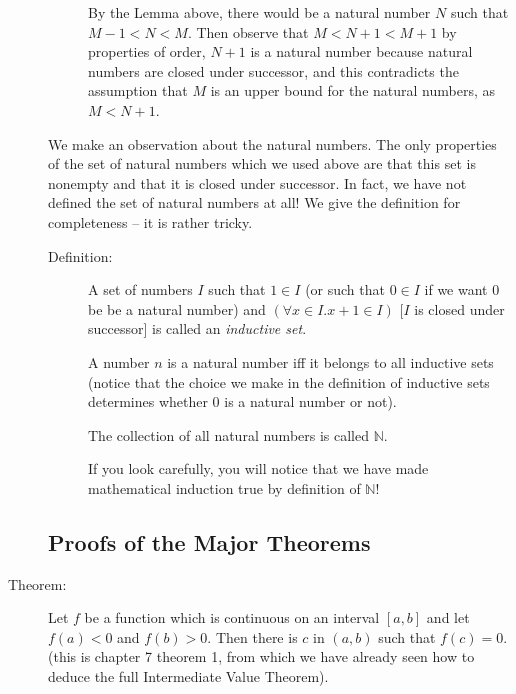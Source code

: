\documentclass[12pt]{article}
\begin{document}
\begin{description}
\begin{description}
By the Lemma above, there would be a natural number $N$ such that $M-1 < N <M$.  Then observe that $M < N+1 <M+1$  by properties of order, 
$N+1$ is a natural number because natural numbers are closed under successor, and this contradicts the assumption that $M$ is an upper bound for the natural numbers, as $M < N+1$.

\end{description}

We make an observation about the natural numbers.   The only properties of the set of natural numbers which we used above are that this set is nonempty and that it is closed under successor.  In fact, we have not defined the set of natural numbers at all!   We give the definition for completeness -- it is rather tricky.

\begin{description}

\item[Definition:]  A set of numbers $I$ such that $1 \in I$ (or such that $0 \in I$ if we want 0 be be a natural number)
and $(\forall x \in I.x+1 \in I)$ [$I$ is closed under successor] is called an {\em inductive set\/}.

A number $n$ is a natural number iff it belongs to all inductive sets (notice that the choice we make in the definition of inductive sets determines whether 0 is
a natural number or not).

The collection of all natural numbers is called $\mathbb N$.

If you look carefully, you will notice that we have made mathematical induction true by definition of $\mathbb N$!

\end{description}

\subsection{Proofs of the Major Theorems}

\item[Theorem:]  Let $f$ be a function which is continuous on an interval $[a,b]$ and let $f(a)<0$ and $f(b)>0$.  Then there is $c$ in $(a,b)$ such that $f(c)=0$.  (this is chapter 7 theorem 1, from which we have already seen how to deduce the full Intermediate Value Theorem).


\end{description}
\end{document}
